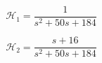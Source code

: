 \problem

\begin{equation}
	\label{eq:p3 plant 1}
	\mathcal{H}_1 = \frac{1}{s^2 + 50 s + 184}
\end{equation}

\begin{equation}
	\label{eq:p3 plant 2}
	\mathcal{H}_2 = \frac{s+16}{s^2 + 50 s + 184}
\end{equation}
